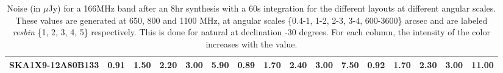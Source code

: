 \begin{table}[htp]
{{\begin{tabular}{|lccccc||ccccc||ccccc|}
SKA1X9-12A80B133 & 0.91 \cellcolor{blue!18.00} & 1.50 \cellcolor{red!53.23} & 2.20 \cellcolor{green!32.00} & 3.00 \cellcolor{orange!60.00} & 5.90 \cellcolor{purple!60.00} & 0.89 \cellcolor{blue!18.00} & 1.70 \cellcolor{red!60.00} & 2.40 \cellcolor{green!60.00} & 3.00 \cellcolor{orange!60.00} & 7.50 \cellcolor{purple!60.00} & 0.92 \cellcolor{blue!21.23} & 1.70 \cellcolor{red!39.00} & 2.30 \cellcolor{green!39.00} & 3.00 \cellcolor{orange!60.00} & 11.00 \cellcolor{purple!60.00}\\ \hline 
\end{tabular}}
\vspace{-0.300000cm}
\hfill
\caption{Noise (in $\mu$Jy) for a 166MHz band after an 8hr synthesis with a 60s integration for the different layouts at different
angular scales. These values are generated at 650, 800 and 1100 MHz, at angular scales \{0.4-1, 1-2, 2-3, 3-4, 600-3600\} arcsec
and are labeled {\it resbin} \{1, 2, 3, 4, 5\} respectively. This is done for natural at declination -30
degrees. For each column, the intensity of the color increases with the value.}\label{tab:noise166}}
 \end{table}
